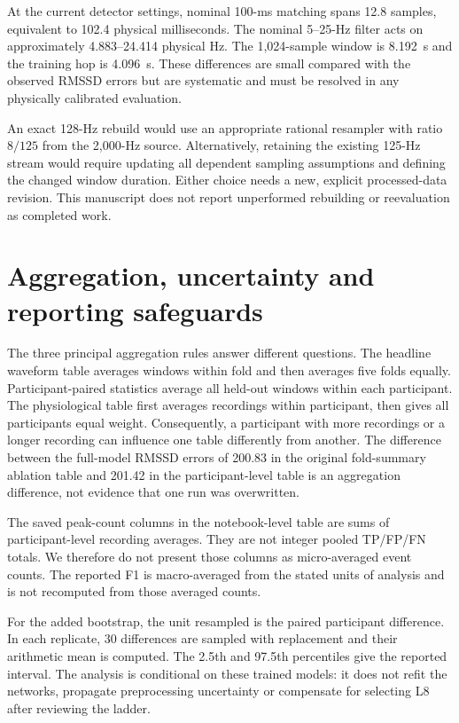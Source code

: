 \documentclass[11pt,a4paper]{article}
\begin{document}
At the current detector settings, nominal 100-ms matching spans 12.8 samples, equivalent
to 102.4 physical milliseconds. The nominal 5--25-Hz filter acts on approximately
4.883--24.414 physical Hz. The 1,024-sample window is 8.192~s and the training hop is
4.096~s. These differences are small compared with the observed RMSSD errors but are
systematic and must be resolved in any physically calibrated evaluation.

An exact 128-Hz rebuild would use an appropriate rational resampler with ratio $8/125$
from the 2,000-Hz source. Alternatively, retaining the existing 125-Hz stream would require
updating all dependent sampling assumptions and defining the changed window duration.
Either choice needs a new, explicit processed-data revision. This manuscript does not
report unperformed rebuilding or reevaluation as completed work.

\section{Aggregation, uncertainty and reporting safeguards}

The three principal aggregation rules answer different questions. The headline waveform
table averages windows within fold and then averages five folds equally. Participant-paired
statistics average all held-out windows within each participant. The physiological table
first averages recordings within participant, then gives all participants equal weight.
Consequently, a participant with more recordings or a longer recording can influence one
table differently from another. The difference between the full-model RMSSD errors of
200.83 in the original fold-summary ablation table and 201.42 in the participant-level
table is an aggregation difference, not evidence that one run was overwritten.

The saved peak-count columns in the notebook-level table are sums of participant-level
recording averages. They are not integer pooled TP/FP/FN totals. We therefore do not
present those columns as micro-averaged event counts. The reported F1 is macro-averaged
from the stated units of analysis and is not recomputed from those averaged counts.

For the added bootstrap, the unit resampled is the paired participant difference. In each
replicate, 30 differences are sampled with replacement and their arithmetic mean is
computed. The 2.5th and 97.5th percentiles give the reported interval. The analysis is
conditional on these trained models: it does not refit the networks, propagate
preprocessing uncertainty or compensate for selecting L8 after reviewing the ladder.
\end{document}
